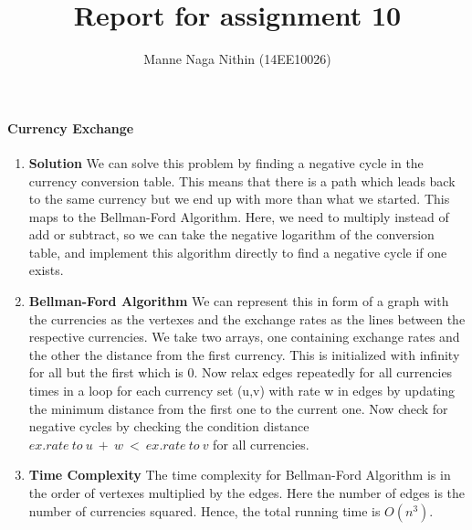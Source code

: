 \documentclass[a4paper,11pt]{article}
\title{Report for assignment 10}
\author{Manne Naga Nithin (14EE10026)}
\begin{document}
\maketitle
\paragraph{Currency Exchange}
\begin{enumerate}

 \item \textbf{Solution}\newline
 We can solve this problem by finding a negative cycle in the currency conversion table. 
 This means that there is a path which leads back to the same currency but we end up with more than what we started. 
 This maps to the Bellman-Ford Algorithm. Here, we need to multiply instead of add or subtract, so we can take the negative logarithm of the conversion table, and implement this algorithm directly to find a negative cycle if one exists.\newline
 \item \textbf{Bellman-Ford Algorithm}\newline
 We can represent this in form of a graph with the currencies as the vertexes and the exchange rates as the lines between the respective currencies.
 We take two arrays, one containing exchange rates and the other the distance from the first currency. This is initialized with infinity for all but the first which is 0.
 Now  relax edges repeatedly for all currencies times in a loop for each currency set (u,v) with rate w in edges by updating the minimum distance from the first one to the current one. 
 Now check for negative cycles by checking the condition distance $ex.rate\ to\ u\ +\ w\ <\ ex.rate\ to\ v$ for all currencies.\newline
 \item \textbf{Time Complexity}\newline
 The time complexity for Bellman-Ford Algorithm is in the order of vertexes multiplied by the edges. 
 Here the number of edges is the number of currencies squared.\newline
 Hence, the total running time is $O(n^3)$.
 
 
 


\end{enumerate}
\end{document}
